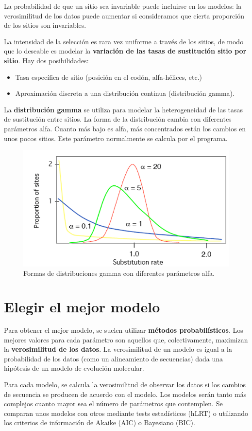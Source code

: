 La probabilidad de que un sitio sea invariable puede incluirse en los modelos: la verosimilitud de los datos puede aumentar si consideramos que cierta proporción de los sitios son invariables.

La intensidad de la selección es rara vez uniforme a través de los sitios, de modo que lo deseable es modelar la \textbf{variación de las tasas de sustitución sitio por sitio}. Hay dos posibilidades:
\begin{itemize}
\item Tasa específica de sitio (posición en el codón, alfa-hélices, etc.)
\item Aproximación discreta a una distribución continua (distribución gamma).
\end{itemize}
La \textbf{distribución gamma} se utiliza para modelar la heterogeneidad de las tasas de sustitución entre sitios. La forma de la distribución cambia con diferentes parámetros alfa. Cuanto más bajo es alfa, más concentrados están los cambios en unos pocos sitios. Este parámetro normalmente se calcula por el programa. 

\begin{figure}[htbp]
\centering
\includegraphics[width=0.5\linewidth]{figs/gamma-distribution.png}
\caption{Formas de distribuciones gamma con diferentes parámetros alfa.}
\end{figure}

\section{Elegir el mejor modelo}
Para obtener el mejor modelo, se suelen utilizar \textbf{métodos probabilísticos}. Los mejores valores para cada parámetro son aquellos que, colectivamente, maximizan la \textbf{verosimilitud de los datos}. La verosimilitud de un modelo es igual a la probabilidad de los datos (como un alineamiento de secuencias) dada una hipótesis de un modelo de evolución molecular.

Para cada modelo, se calcula la verosimilitud de observar los datos si los cambios de secuencia se producen de acuerdo con el modelo. Los modelos serán tanto más complejos cuanto mayor sea el número de parámetros que contemplen. Se comparan unos modelos con otros mediante tests estadísticos (hLRT) o utilizando los criterios de información de Akaike (AIC) o Bayesiano (BIC).

